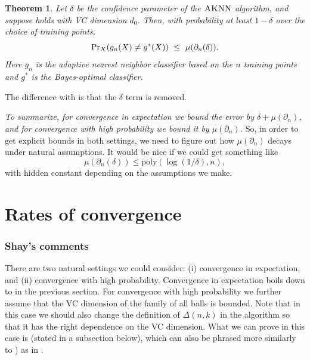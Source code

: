 \documentclass{article}
\def\pr{{\rm Pr}}
\def\X{{\mathcal X}}
\newcommand{\algname}{\textsc{AKNN}}
\newtheorem{theorem}{Theorem}
\newcommand{\comment}[3]{}  %
\newcommand{\akshay}[1]{\comment{blue}{Akshay}{#1}}
\begin{document}
\begin{theorem}\label{thm:fastrate2}
Let $\delta$ be the confidence parameter of the $\algname$ algorithm, and suppose  holds with VC dimension $d_0$.
Then, with probability at least $1-\delta$ over the choice of training points,
\[ \pr_{X}(g_n(X) \neq g^*(X)) \ \leq \ \mu(\partial_n (\delta)) .\]
Here $g_n$ is the adaptive nearest neighbor classifier based on the $n$ training points and $g^*$ is the Bayes-optimal classifier. 
\end{theorem}

\akshay{Is it worth showing that \Cref{thm:fastrate2} is tight, e.g. the instance-dependent lower bounds of \cite{ChaudhuriDasgupta2014}?}



The difference with  is that the $\delta$ term is removed.

{\it To summarize, for convergence in expectation we bound the error by $\delta + \mu(\partial_n)$,
and for convergence with high probability we bound it by $\mu(\partial_n)$.}
So, in order to get explicit bounds in both settings, we need to figure out how $\mu(\partial_n)$ decays under natural assumptions. It would be nice if we could get something like 
\[\mu(\partial_n (\delta)) \leq \mathrm{poly}\left(\log(1/\delta), n\right),
\]
with hidden constant depending on the assumptions we make.
\akshay{Here I think the smoothness condition introduced in \cite{ChaudhuriDasgupta2014} is relevant.}


\section{Rates of convergence}


\subsubsection{Shay's comments}

There are two natural settings we could consider: (i) convergence in expectation, and (ii) convergence with high probability.
Convergence in expectation boils down to  in the previous section.
For convergence with high probability we further assume that the VC dimension of the family of all balls is bounded. 
Note that in this case we should also change the definition of $\Delta(n,k)$  in the algorithm so that it has the right dependence on the VC dimension. \akshay{It's already correct in the initial definition of the algorithm, but not consistent in the definitions of $\X^{\pm}_n$.} What we can prove in this case is  (stated in a subsection below), 
which can also be phrased more similarly to ) as in .
\end{document}
